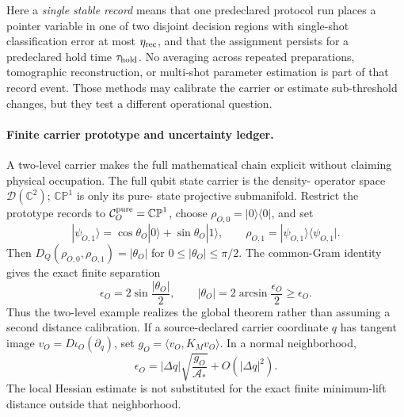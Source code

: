 \documentclass[11pt]{article}
\begin{document}
Here a \emph{single stable record} means that one predeclared protocol run
places a pointer variable in one of two disjoint decision regions with
single-shot classification error at most \(\eta_{\rm rec}\), and that the
assignment persists for a predeclared hold time \(\tau_{\rm hold}\).  No
averaging across repeated preparations, tomographic reconstruction, or
multi-shot parameter estimation is part of that record event.  Those methods
may calibrate the carrier or estimate sub-threshold changes, but they test a
different operational question.

\paragraph{Finite carrier prototype and uncertainty ledger.}
A two-level carrier makes the full mathematical chain explicit without
claiming physical occupation.  The full qubit state carrier is the density-
operator space \(\mathcal D(\mathbb C^2)\); \(\mathbb{CP}^1\) is only its pure-
state projective submanifold.  Restrict the prototype records to
\(\mathcal C_O^{\rm pure}=\mathbb{CP}^1\), choose
\(\rho_{O,0}=|0\rangle\langle0|\), and set
\[
  |\psi_{O,1}\rangle
  =\cos\theta_O|0\rangle+\sin\theta_O|1\rangle,
  \qquad
  \rho_{O,1}=|\psi_{O,1}\rangle\langle\psi_{O,1}|.
\]
Then \(D_Q(\rho_{O,0},\rho_{O,1})=|\theta_O|\) for
\(0\leq|\theta_O|\leq\pi/2\).  The common-Gram identity gives the exact finite
separation
\begin{equation}
  \epsilon_O=2\sin\frac{|\theta_O|}{2},
  \qquad
  |\theta_O|=2\arcsin\frac{\epsilon_O}{2}\geq\epsilon_O.
  \label{eq:finite-carrier-epsilon}
\end{equation}
Thus the two-level example realizes the global theorem rather than assuming a
second distance calibration.  If a source-declared carrier coordinate \(q\)
has tangent image \(v_O=D\iota_O(\partial_q)\), set
\(g_O=\langle v_O,K_Mv_O\rangle\).  In a normal neighborhood,
\begin{equation}
  \epsilon_O
  =|\Delta q|\sqrt{\frac{g_O}{\mathcal A_*}}
  +O(|\Delta q|^2).
  \label{eq:local-carrier-epsilon}
\end{equation}
The local Hessian estimate is not substituted for the exact finite
minimum-lift distance outside that neighborhood.
\end{document}
